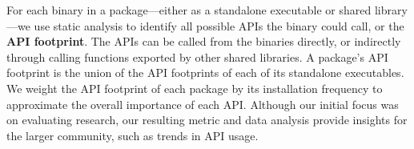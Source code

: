 


For each binary in a package---either as a standalone executable or shared 
library---we use static analysis to identify all possible APIs the binary could call,
or the {\bf API footprint}.
The APIs can be called from the binaries directly,
or indirectly through calling functions exported by other shared libraries.
A package's API footprint is the union of the API 
footprints of each of its standalone executables.
We weight the API footprint of each package by its installation frequency
to approximate the overall importance of each API.
Although our initial focus was on evaluating research,
our resulting metric and data analysis provide insights for
the larger community, such as trends in API usage.








